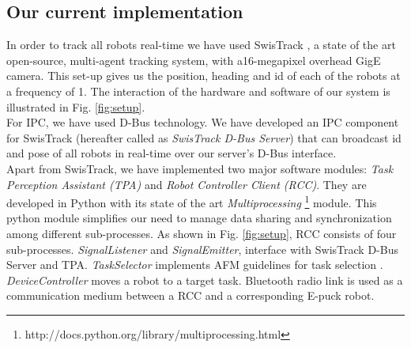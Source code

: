 \documentclass[letterpaper, 10 pt, times, conference]{ieeeconf} %
\begin{document}
\subsection{Our current implementation}
In order to track all robots real-time we have used SwisTrack \cite{SwisTrack}, a state of the art open-source, multi-agent tracking system, with a16-megapixel overhead GigE camera. This set-up gives us the position, heading and id of each of the robots at a frequency of 1. The interaction of the hardware and software of our system is illustrated in Fig. \ref{fig:setup}. \\
For IPC, we have used D-Bus technology. %
We have developed an IPC component for SwisTrack (hereafter called as \textit{SwisTrack D-Bus Server}) that can broadcast id and pose of all robots in real-time over our server's D-Bus interface.\\
Apart from SwisTrack, we have implemented two major software modules: {\em Task Perception Assistant (TPA)} and {\em Robot Controller Client (RCC)}. They are developed in Python with its state of the art \textit{Multiprocessing} \footnote{http://docs.python.org/library/multiprocessing.html} module. This python module simplifies our need to manage data sharing and synchronization among different sub-processes. As shown in Fig. \ref{fig:setup}, RCC consists of four sub-processes. {\em SignalListener} and {\em SignalEmitter}, interface with SwisTrack D-Bus Server and TPA. {\em TaskSelector} implements AFM guidelines for task selection . {\em DeviceController} moves a robot to a target task. Bluetooth radio link is used as a communication medium between a RCC and a corresponding E-puck robot. 
%
\end{document}
